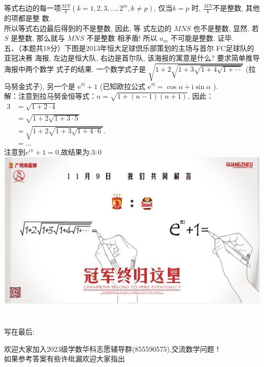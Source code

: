 \documentclass[a4paper,11pt,UTF8]{article}
\begin{document}
等式右边的每一项$\displaystyle\frac{M N}{k}(k=1,2,3, \ldots, 2^m,k\neq p)$, 仅当$k=p$ 时, $\displaystyle\frac{M N}{k}$不是整数, 其他的项都是整 数.\\
所以等式右边最后得到的不是整数, 因此, 等 式左边的 $M N S$ 也不是整数,
显然, 若 $S$ 是整数, 那么就与 $M N S$ 不是整数 相矛盾!
所以 $a_m$ 不可能是整数. 证毕.\\
五、（本题共18分）下图是2013年恒大足球倶乐部策划的主场与首尔 FC足球队的亚冠决赛 海报, 左边是恒大队, 右边是首尔队, 该海报的寓意是什么? 要求简单推导海报中两个数学 式子的结果. 一个数学式子是 $\sqrt{1+2 \sqrt{1+3 \sqrt{1+4 \sqrt{1+\cdots}}}}$ (拉马努金式子), 另一个是 $\mathrm{e}^{\pi \mathrm{i}}+1$ (已知欧拉公式 $\mathrm{e}^{\pi \mathrm{i}}=\cos \alpha+\mathrm{i} \sin \alpha$ ).\\
解：注意到拉马努金恒等式：$n=\sqrt{1+(n-1)(n+1)}$, 因此： \\
$\begin{aligned}
   3&=\sqrt{1+2\cdot4}  \\
	&=\sqrt{1+2\sqrt{1+3\cdot5}} \\
	&=\sqrt{1+2\sqrt{1+3\sqrt{1+4\cdot6}}}. \\
	&=\ldots 
\end{aligned}$\\
注意到$e^{i\pi}+1=0$,故结果为:$3:0$\\
\includegraphics[scale=0.9]{./2014_l.jpg}\\\\\\
写在最后:

欢迎大家加入2023级学数华科志愿辅导群(855590575),交流数学问题！\\
如果参考答案有些许纰漏欢迎大家指出
\end{document}
